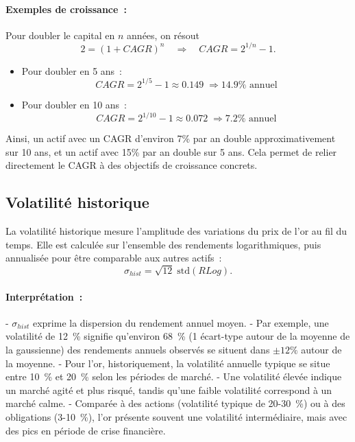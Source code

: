 \documentclass[12pt,a4paper]{article}
\begin{document}
\paragraph{Exemples de croissance~:} 

Pour doubler le capital en $n$ années, on résout
\[
2 = (1 + CAGR)^n \quad \Rightarrow \quad CAGR = 2^{1/n} - 1.
\]

\begin{itemize}
    \item Pour doubler en 5 ans~: 
    \[
    CAGR = 2^{1/5} - 1 \approx 0.149 \; \Rightarrow 14.9\% \text{ annuel}
    \]
    \item Pour doubler en 10 ans~: 
    \[
    CAGR = 2^{1/10} - 1 \approx 0.072 \; \Rightarrow 7.2\% \text{ annuel}
    \]
\end{itemize}

Ainsi, un actif avec un CAGR d'environ 7\% par an double approximativement sur 10 ans, 
et un actif avec 15\% par an double sur 5 ans. Cela permet de relier directement 
le CAGR à des objectifs de croissance concrets.



\subsection{Volatilité historique}

La volatilité historique mesure l'amplitude des variations du prix de
l'or au fil du temps. Elle est calculée sur l'ensemble des rendements
logarithmiques, puis annualisée pour être comparable aux autres actifs~:
\begin{equation}
    \sigma_{hist} = \sqrt{12} \; \mathrm{std}(RLog).
\end{equation}

\paragraph{Interprétation~:} 

- $\sigma_{hist}$ exprime la dispersion du rendement annuel moyen.  
- Par exemple, une volatilité de 12~\% signifie qu'environ 68~\%
  (1 écart-type autour de la moyenne de la gaussienne)
  des rendements annuels observés se situent dans $\pm 12\%$ autour de
  la moyenne.  
- Pour l'or, historiquement, la volatilité annuelle typique se situe
  entre 10~\% et 20~\% selon les périodes de marché.  
- Une volatilité élevée indique un marché agité et plus risqué, tandis
  qu'une faible volatilité correspond à un marché calme.  
- Comparée à des actions (volatilité typique de 20-30~\%) ou à des
  obligations (3-10~\%), l'or présente souvent une volatilité
  intermédiaire, mais avec des pics en période de crise financière.
\end{document}
